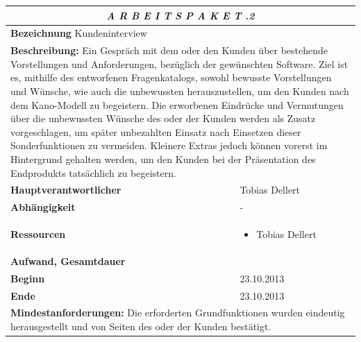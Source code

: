 \documentclass[fontsize=12pt,paper=a4,twoside]{scrartcl}
\begin{document}
\begin{tabular}{p{7.5cm}|p{7.5cm}}\toprule
\multicolumn{2}{c}{\textbf{\textit{A R B E I T S P A K E T \quad 2.1.2}}} \\ \toprule \hline
\textbf{Bezeichnung} Kundeninterview\\\hline
\multicolumn{2}{p{15cm}}{\textbf{Beschreibung:} \newline 
Ein Gespräch mit dem oder den Kunden über bestehende Vorstellungen und Anforderungen, bezüglich der gewünschten Software. Ziel ist es, mithilfe des 
entworfenen Fragenkatalogs, sowohl bewusste Vorstellungen und Wünsche, wie auch die unbewussten 
herauszustellen, um den Kunden nach dem Kano-Modell zu begeistern. Die erworbenen Eindrücke und Vermutungen über die unbewussten Wünsche des oder der Kunden werden als Zusatz vorgeschlagen, um später unbezahlten Einsatz nach Einsetzen dieser Sonderfunktionen zu vermeiden. Kleinere Extras jedoch können vorerst im Hintergrund gehalten werden, um den Kunden bei der Präsentation des Endprodukts tatsächlich zu begeistern.  }  \\\hline
\textbf{Hauptverantwortlicher} & Tobias Dellert \\\hline
\textbf{Abhängigkeit} & -\\\hline
\textbf{Ressourcen} & \begin{itemize} 
\itemsep0pt
\item Tobias Dellert
\end{itemize} \\\hline
\textbf{Aufwand, Gesamtdauer} & \\\hline
\textbf{Beginn} & 23.10.2013 \\\hline
\textbf{Ende} & 23.10.2013\\\hline
\multicolumn{2}{p{15cm}}{\textbf{Mindestanforderungen: } \newline
Die erforderten Grundfunktionen wurden eindeutig 
herausgestellt und von Seiten des oder der Kunden bestätigt.  }  \\ \toprule
\end{tabular} \\\\
\end{document}
